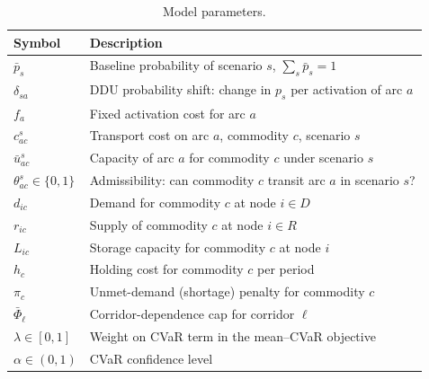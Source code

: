 \documentclass[final,3p,authoryear]{elsarticle}
\theoremstyle{definition}
\begin{document}
\begin{table}[H]
\centering
\caption{Model parameters.}
\label{tab:params}
\begin{tabularx}{\textwidth}{@{}>{\raggedright\arraybackslash}p{2.5cm}X@{}}
\toprule
Symbol & Description \\
\midrule
$\bar{p}_s$ & Baseline probability of scenario $s$, $\sum_{s} \bar{p}_s = 1$ \\
$\delta_{sa}$ & DDU probability shift: change in $p_s$ per activation of arc $a$ \\
$f_a$ & Fixed activation cost for arc $a$ \\
$c_{ac}^{s}$ & Transport cost on arc $a$, commodity $c$, scenario $s$ \\
$\bar{u}_{ac}^{s}$ & Capacity of arc $a$ for commodity $c$ under scenario $s$ \\
$\theta_{ac}^{s} \in \{0,1\}$ & Admissibility: can commodity $c$ transit arc $a$ in scenario $s$? \\
$d_{ic}$ & Demand for commodity $c$ at node $i \in D$ \\
$r_{ic}$ & Supply of commodity $c$ at node $i \in R$ \\
$L_{ic}$ & Storage capacity for commodity $c$ at node $i$ \\
$h_{c}$ & Holding cost for commodity $c$ per period \\
$\pi_{c}$ & Unmet-demand (shortage) penalty for commodity $c$ \\
$\bar{\Phi}_\ell$ & Corridor-dependence cap for corridor $\ell$ \\
$\lambda \in [0,1]$ & Weight on CVaR term in the mean--CVaR objective \\
$\alpha \in (0,1)$ & CVaR confidence level \\
\bottomrule
\end{tabularx}
\end{table}
\end{document}
